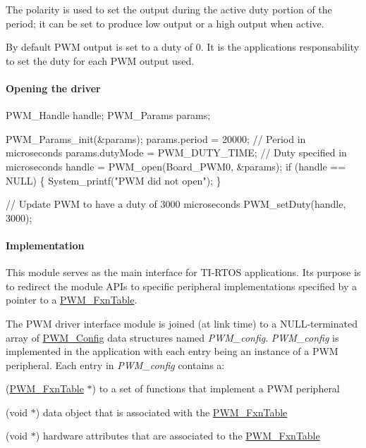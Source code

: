 The polarity is used to set the output during the active duty portion of the period; it can be set to produce low output or a high output when active.

By default P\+W\+M output is set to a duty of 0. It is the applications responsability to set the duty for each P\+W\+M output used.

\paragraph*{Opening the driver}


\begin{DoxyCode}
PWM_Handle      handle;
PWM_Params      params;

PWM_Params_init(&params);
params.period = 20000;             \textcolor{comment}{// Period in microseconds}
params.dutyMode = PWM_DUTY_TIME;   \textcolor{comment}{// Duty specified in microseconds}
handle = PWM_open(Board\_PWM0, &params);
\textcolor{keywordflow}{if} (handle == NULL) \{
    System\_printf(\textcolor{stringliteral}{"PWM did not open"});
\}

\textcolor{comment}{// Update PWM to have a duty of 3000 microseconds}
PWM_setDuty(handle, 3000);
\end{DoxyCode}


\paragraph*{Implementation}

This module serves as the main interface for T\+I-\/\+R\+T\+O\+S applications. Its purpose is to redirect the module A\+P\+Is to specific peripheral implementations specified by a pointer to a \hyperlink{struct_p_w_m___fxn_table}{P\+W\+M\+\_\+\+Fxn\+Table}.

The P\+W\+M driver interface module is joined (at link time) to a N\+U\+L\+L-\/terminated array of \hyperlink{struct_p_w_m___config}{P\+W\+M\+\_\+\+Config} data structures named {\itshape P\+W\+M\+\_\+config}. {\itshape P\+W\+M\+\_\+config} is implemented in the application with each entry being an instance of a P\+W\+M peripheral. Each entry in {\itshape P\+W\+M\+\_\+config} contains a\+:
\begin{DoxyItemize}
\item (\hyperlink{struct_p_w_m___fxn_table}{P\+W\+M\+\_\+\+Fxn\+Table} $\ast$) to a set of functions that implement a P\+W\+M peripheral
\item (void $\ast$) data object that is associated with the \hyperlink{struct_p_w_m___fxn_table}{P\+W\+M\+\_\+\+Fxn\+Table}
\item (void $\ast$) hardware attributes that are associated to the \hyperlink{struct_p_w_m___fxn_table}{P\+W\+M\+\_\+\+Fxn\+Table}
\end{DoxyItemize}

